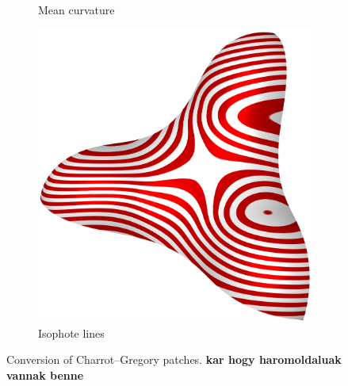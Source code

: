 \documentclass{article}
\begin{document}
\begin{figure}[h!]
\begin{subfigure}{0.23\textwidth}
    \caption{Mean curvature}
    \label{fig:trebol-mean}
  \end{subfigure}
  \begin{subfigure}{0.23\textwidth}
    \includegraphics[width = \textwidth]{images/trebol3-zebra.jpg}
    \caption{Isophote lines}
    \label{fig:trebol-iso}
  \end{subfigure}
  \caption{Conversion of Charrot--Gregory patches. \bf kar hogy haromoldaluak vannak benne}
  \label{fig:trebol}
\end{figure}
\end{document}
